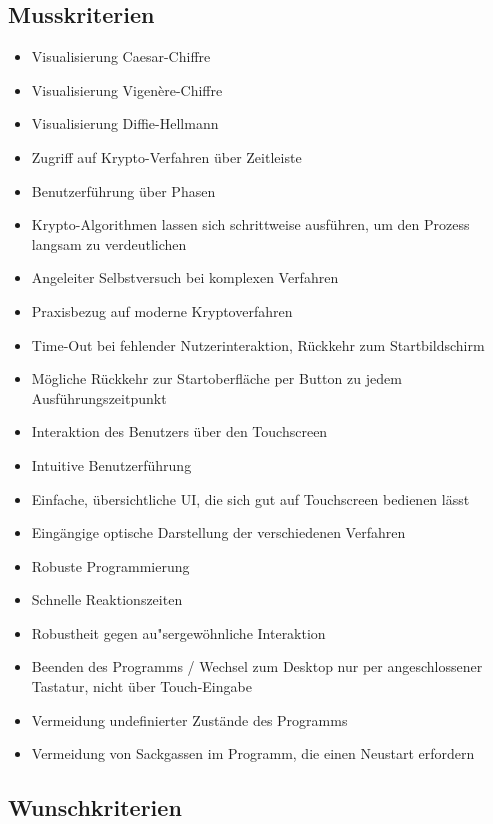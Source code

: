 \documentclass{article}
\begin{document}
\subsection{Musskriterien}

\begin{itemize}
    \item Visualisierung Caesar-Chiffre
    \item Visualisierung Vigenère-Chiffre
    \item Visualisierung Diffie-Hellmann
    \item Zugriff auf Krypto-Verfahren über Zeitleiste
    \item Benutzerführung über Phasen
    \item Krypto-Algorithmen lassen sich schrittweise ausführen, um den Prozess
        langsam zu verdeutlichen
    \item Angeleiter Selbstversuch bei komplexen Verfahren
    \item Praxisbezug auf moderne Kryptoverfahren
    \item Time-Out bei fehlender Nutzerinteraktion, Rückkehr zum Startbildschirm
    \item Mögliche Rückkehr zur Startoberfläche per Button zu jedem Ausführungszeitpunkt
    \item Interaktion des Benutzers über den Touchscreen
    \item Intuitive Benutzerführung
    \item Einfache, übersichtliche UI, die sich gut auf Touchscreen bedienen lässt
    \item Eingängige optische Darstellung der verschiedenen Verfahren
    \item Robuste Programmierung
    \item Schnelle Reaktionszeiten
    \item Robustheit gegen au"sergewöhnliche Interaktion
    \item Beenden des Programms / Wechsel zum Desktop nur per angeschlossener Tastatur, nicht über Touch-Eingabe
    \item Vermeidung undefinierter Zustände des Programms
    \item Vermeidung von Sackgassen im Programm, die einen Neustart erfordern
\end{itemize}

\subsection{Wunschkriterien}
\end{document}
